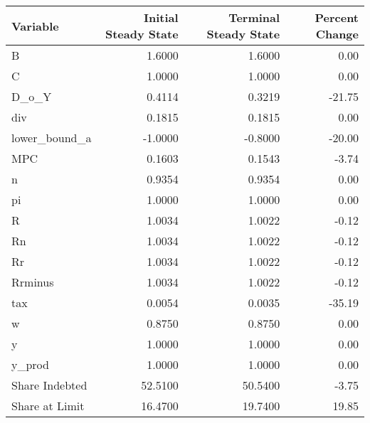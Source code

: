 \begin{table}
\centering
\label{tab:stst}
\begin{tabular}{lrrr}
\toprule
      Variable &  Initial Steady State &  Terminal Steady State &  Percent Change \\
\midrule
             B &                1.6000 &                 1.6000 &            0.00 \\
             C &                1.0000 &                 1.0000 &            0.00 \\
         D\_o\_Y &                0.4114 &                 0.3219 &          -21.75 \\
           div &                0.1815 &                 0.1815 &            0.00 \\
 lower\_bound\_a &               -1.0000 &                -0.8000 &          -20.00 \\
           MPC &                0.1603 &                 0.1543 &           -3.74 \\
             n &                0.9354 &                 0.9354 &            0.00 \\
            pi &                1.0000 &                 1.0000 &            0.00 \\
             R &                1.0034 &                 1.0022 &           -0.12 \\
            Rn &                1.0034 &                 1.0022 &           -0.12 \\
            Rr &                1.0034 &                 1.0022 &           -0.12 \\
       Rrminus &                1.0034 &                 1.0022 &           -0.12 \\
           tax &                0.0054 &                 0.0035 &          -35.19 \\
             w &                0.8750 &                 0.8750 &            0.00 \\
             y &                1.0000 &                 1.0000 &            0.00 \\
        y\_prod &                1.0000 &                 1.0000 &            0.00 \\
Share Indebted &               52.5100 &                50.5400 &           -3.75 \\
Share at Limit &               16.4700 &                19.7400 &           19.85 \\
\bottomrule
\end{tabular}
\end{table}
